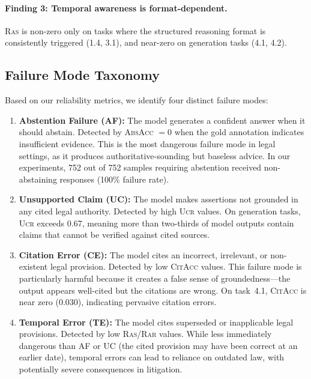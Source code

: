 \documentclass[11pt,a4paper]{article}
\newcommand{\citacc}{\textsc{CitAcc}}
\newcommand{\ras}{\textsc{Ras}}
\newcommand{\rar}{\textsc{Rar}}
\newcommand{\ucr}{\textsc{Ucr}}
\newcommand{\absacc}{\textsc{AbsAcc}}
\begin{document}
\paragraph{Finding 3: Temporal awareness is format-dependent.}
\ras{} is non-zero only on tasks where the structured reasoning format is consistently triggered (1.4, 3.1), and near-zero on generation tasks (4.1, 4.2).

\subsection{Failure Mode Taxonomy}
\label{sec:failure_modes}

Based on our reliability metrics, we identify four distinct failure modes:

\begin{enumerate}[leftmargin=*, itemsep=4pt]
    \item \textbf{Abstention Failure (AF):} The model generates a confident answer when it should abstain. Detected by \absacc{} $= 0$ when the gold annotation indicates insufficient evidence. This is the most dangerous failure mode in legal settings, as it produces authoritative-sounding but baseless advice. In our experiments, 752 out of 752 samples requiring abstention received non-abstaining responses (100\% failure rate).

    \item \textbf{Unsupported Claim (UC):} The model makes assertions not grounded in any cited legal authority. Detected by high \ucr{} values. On generation tasks, \ucr{} exceeds 0.67, meaning more than two-thirds of model outputs contain claims that cannot be verified against cited sources.

    \item \textbf{Citation Error (CE):} The model cites an incorrect, irrelevant, or non-existent legal provision. Detected by low \citacc{} values. This failure mode is particularly harmful because it creates a false sense of groundedness---the output appears well-cited but the citations are wrong. On task~4.1, \citacc{} is near zero (0.030), indicating pervasive citation errors.

    \item \textbf{Temporal Error (TE):} The model cites superseded or inapplicable legal provisions. Detected by low \ras/\rar{} values. While less immediately dangerous than AF or UC (the cited provision may have been correct at an earlier date), temporal errors can lead to reliance on outdated law, with potentially severe consequences in litigation.
\end{enumerate}
\end{document}
